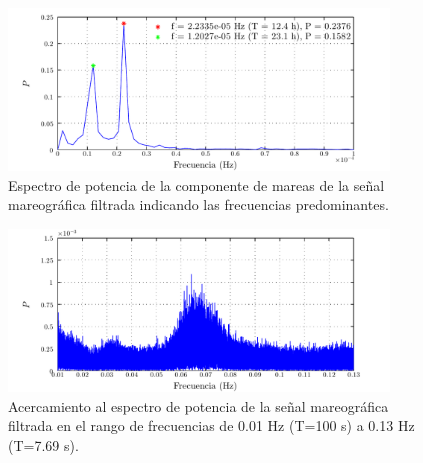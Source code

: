 \documentclass[a4paper,12pt,final]{article}
\begin{document}
      \begin{figure}[H]
        \begin{center}
          \caption{Espectro de potencia de la componente de mareas de la señal mareográfica filtrada indicando las frecuencias predominantes.}
          \label{p3f6}
          \vspace{-1em}
          \includegraphics[width=0.9\textwidth]{./laboratorio_5/problema03_power_spectrum_tidal.pdf}
        \end{center}
      \end{figure}
      \vfill

      \newpage
      \begin{figure}[H]
        \begin{center}
          \caption{Acercamiento al espectro de potencia de la señal mareográfica filtrada en el rango de frecuencias de 0.01 Hz (T=100 s) a 0.13 Hz (T=7.69 s).}
          \label{p3f7}
          \vspace{-1em}
          \includegraphics[width=0.9\textwidth]{./laboratorio_5/problema03_power_spectrum_focus.pdf}
        \end{center}
      \end{figure}
      \vspace{-0.25em}
\end{document}
